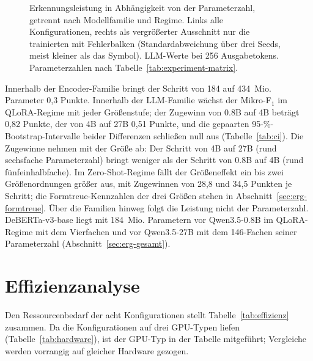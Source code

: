 \begin{figure}[htbp]
  \caption[Erkennungsleistung in Abhängigkeit von der Parameterzahl]{Erkennungsleistung in Abhängigkeit von der Parameterzahl,
  getrennt nach Modellfamilie und Regime.
  Links alle Konfigurationen, rechts als vergrößerter Ausschnitt nur die
  trainierten mit Fehlerbalken (Standardabweichung über drei Seeds, meist
  kleiner als das Symbol).
  LLM-Werte bei 256 Ausgabetokens.
  Parameterzahlen nach Tabelle~\ref{tab:experiment-matrix}.}
  \label{fig:groesse}
\end{figure}

Innerhalb der Encoder-Familie bringt der Schritt von 184 auf 434~Mio.
Parameter 0,3 Punkte.
Innerhalb der LLM-Familie wächst der Mikro-F$_1$ im QLoRA-Regime mit
jeder Größenstufe; der Zugewinn von 0.8B auf 4B beträgt 0,82 Punkte, der
von 4B auf 27B 0,51 Punkte, und die gepaarten 95-\%-Bootstrap-Intervalle
beider Differenzen schließen null aus (Tabelle~\ref{tab:ci}).
Die Zugewinne nehmen mit der Größe ab: Der Schritt von 4B auf 27B (rund
sechsfache Parameterzahl) bringt weniger als der Schritt von 0.8B auf 4B
(rund fünfeinhalbfache).
Im Zero-Shot-Regime fällt der Größeneffekt ein bis zwei Größenordnungen
größer aus, mit Zugewinnen von 28,8 und 34,5 Punkten je Schritt; die
Formtreue-Kennzahlen der drei Größen stehen in
Abschnitt~\ref{sec:erg-formtreue}.
Über die Familien hinweg folgt die Leistung nicht der Parameterzahl.
DeBERTa-v3-base liegt mit 184~Mio. Parametern
vor Qwen3.5-0.8B im QLoRA-Regime mit dem Vierfachen und vor
Qwen3.5-27B mit dem 146-Fachen seiner Parameterzahl
(Abschnitt~\ref{sec:erg-gesamt}).


\section{Effizienzanalyse}
\label{sec:erg-effizienz}

Den Ressourcenbedarf der acht Konfigurationen stellt
Tabelle~\ref{tab:effizienz} zusammen.
Da die Konfigurationen auf drei GPU-Typen liefen
(Tabelle~\ref{tab:hardware}), ist der GPU-Typ in der Tabelle
mitgeführt; Vergleiche werden vorrangig auf gleicher Hardware
gezogen.

